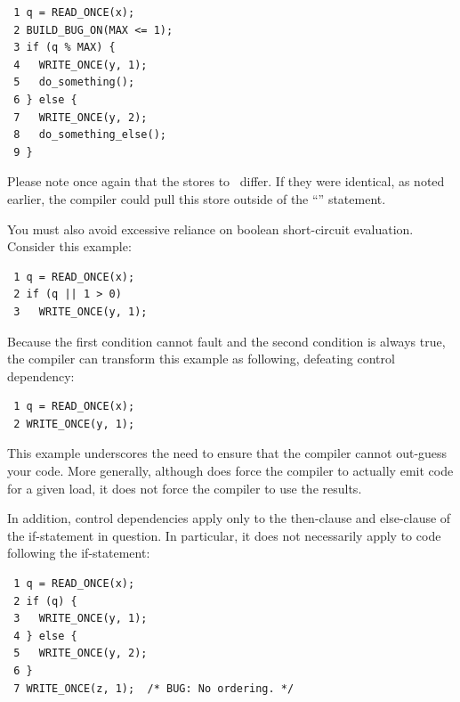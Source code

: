 \vspace{5pt}
\begin{minipage}[t]{\columnwidth}
\scriptsize
\begin{verbatim}
 1 q = READ_ONCE(x);
 2 BUILD_BUG_ON(MAX <= 1);
 3 if (q % MAX) {
 4   WRITE_ONCE(y, 1);
 5   do_something();
 6 } else {
 7   WRITE_ONCE(y, 2);
 8   do_something_else();
 9 }
\end{verbatim}
\end{minipage}
\vspace{5pt}

Please note once again that the stores to~ differ.
If they were identical, as noted earlier, the compiler could pull this
store outside of the ``'' statement.

You must also avoid excessive reliance on boolean short-circuit evaluation.
Consider this example:

\vspace{5pt}
\begin{minipage}[t]{\columnwidth}
\scriptsize
\begin{verbatim}
 1 q = READ_ONCE(x);
 2 if (q || 1 > 0)
 3   WRITE_ONCE(y, 1);
\end{verbatim}
\end{minipage}
\vspace{5pt}

Because the first condition cannot fault and the second condition is
always true, the compiler can transform this example as following,
defeating control dependency:

\vspace{5pt}
\begin{minipage}[t]{\columnwidth}
\scriptsize
\begin{verbatim}
 1 q = READ_ONCE(x);
 2 WRITE_ONCE(y, 1);
\end{verbatim}
\end{minipage}
\vspace{5pt}

This example underscores the need to ensure that the compiler cannot
out-guess your code.
More generally, although  does force
the compiler to actually emit code for a given load, it does not force
the compiler to use the results.

In addition, control dependencies apply only to the then-clause and
else-clause of the if-statement in question.
In particular, it does
not necessarily apply to code following the if-statement:

\vspace{5pt}
\begin{minipage}[t]{\columnwidth}
\scriptsize
\begin{verbatim}
 1 q = READ_ONCE(x);
 2 if (q) {
 3   WRITE_ONCE(y, 1);
 4 } else {
 5   WRITE_ONCE(y, 2);
 6 }
 7 WRITE_ONCE(z, 1);  /* BUG: No ordering. */
\end{verbatim}
\end{minipage}
\vspace{5pt}


